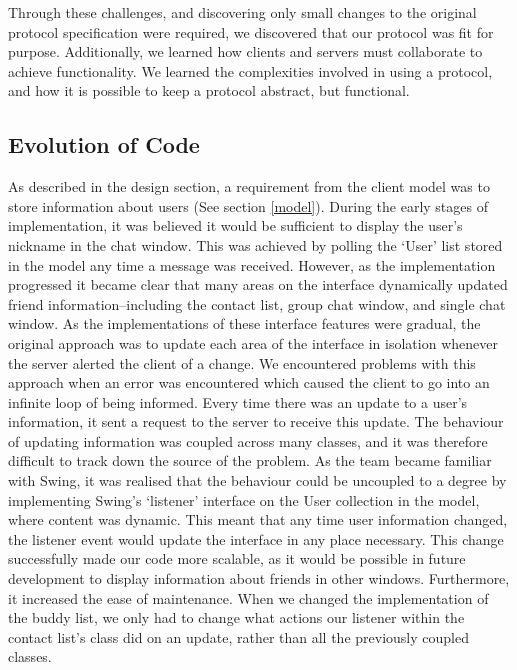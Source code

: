 Through these challenges, and discovering only small changes to the original protocol specification were required, we discovered that our protocol was fit for purpose. Additionally, we learned how clients and servers must collaborate to achieve functionality. We learned the complexities involved in using a protocol, and how it is possible to keep a protocol abstract, but functional. 


\subsection{Evolution of Code}
\label{code_evol}

As described in the design section, a requirement from the client model was to store information about users (See section \ref{model}). During the early stages of implementation, it was believed it would be sufficient to display the user's nickname in the chat window. This was achieved by polling the `User' list stored in the model any time a message was received. However, as the implementation progressed it became clear that many areas on the interface dynamically updated friend information--including the contact list, group chat window, and single chat window. As the implementations of these interface features were gradual, the original approach was to update each area of the interface in isolation whenever the server alerted the client of a change. We encountered problems with this approach when an error was encountered which caused the client to go into an infinite loop of being informed. Every time there was an update to a user's information, it sent a request to the server to receive this update. The behaviour of updating information was coupled across many classes, and it was therefore difficult to track down the source of the problem. As the team became familiar with Swing, it was realised that the behaviour could be uncoupled to a degree by implementing Swing's `listener' interface on the User collection in the model, where content was dynamic. This meant that any time user information changed, the listener event would update the interface in any place necessary. This change successfully made our code more scalable, as it would be possible in future development to display information about friends in other windows. Furthermore, it increased the ease of maintenance. When we changed the implementation of the buddy list, we only had to change what actions our listener within the contact list's class did on an update, rather than all the previously coupled classes. 


